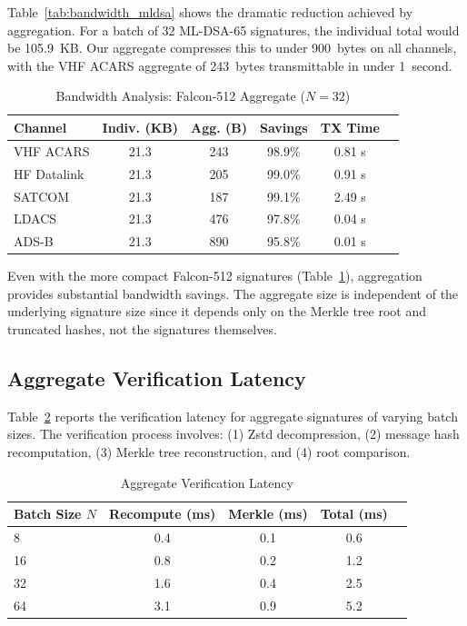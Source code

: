 \documentclass[conference,10pt]{IEEEtran}
\begin{document}
Table~\ref{tab:bandwidth_mldsa} shows the dramatic reduction achieved by aggregation. For a batch of 32 ML-DSA-65 signatures, the individual total would be 105.9~KB. Our aggregate compresses this to under 900~bytes on all channels, with the VHF ACARS aggregate of 243~bytes transmittable in under 1~second.

\begin{table}[t]
\centering
\caption{Bandwidth Analysis: Falcon-512 Aggregate ($N=32$)}
\label{tab:bandwidth_falcon}
\begin{tabular}{lccccc}
\toprule
\textbf{Channel} & \textbf{Indiv. (KB)} & \textbf{Agg. (B)} & \textbf{Savings} & \textbf{TX Time} \\
\midrule
VHF ACARS & 21.3 & 243 & 98.9\% & 0.81 s \\
HF Datalink & 21.3 & 205 & 99.0\% & 0.91 s \\
SATCOM & 21.3 & 187 & 99.1\% & 2.49 s \\
LDACS & 21.3 & 476 & 97.8\% & 0.04 s \\
ADS-B & 21.3 & 890 & 95.8\% & 0.01 s \\
\bottomrule
\end{tabular}
\end{table}

Even with the more compact Falcon-512 signatures (Table~\ref{tab:bandwidth_falcon}), aggregation provides substantial bandwidth savings. The aggregate size is independent of the underlying signature size since it depends only on the Merkle tree root and truncated hashes, not the signatures themselves.

\subsection{Aggregate Verification Latency}

Table~\ref{tab:verification_latency} reports the verification latency for aggregate signatures of varying batch sizes. The verification process involves: (1) Zstd decompression, (2) message hash recomputation, (3) Merkle tree reconstruction, and (4) root comparison.

\begin{table}[t]
\centering
\caption{Aggregate Verification Latency}
\label{tab:verification_latency}
\begin{tabular}{lcccc}
\toprule
\textbf{Batch Size $N$} & \textbf{Recompute (ms)} & \textbf{Merkle (ms)} & \textbf{Total (ms)} \\
\midrule
8 & 0.4 & 0.1 & 0.6 \\
16 & 0.8 & 0.2 & 1.2 \\
32 & 1.6 & 0.4 & 2.5 \\
64 & 3.1 & 0.9 & 5.2 \\
\bottomrule
\end{tabular}
\end{table}
\end{document}
